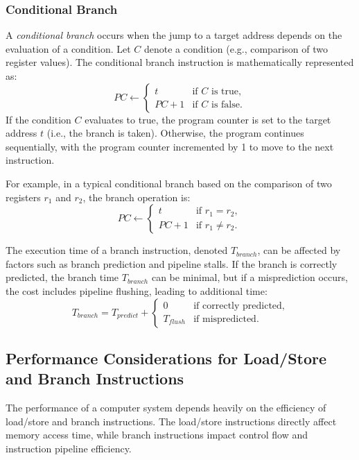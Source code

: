 \subsubsection{Conditional Branch}

A \emph{conditional branch} occurs when the jump to a target address depends on the evaluation of a condition. Let $C$ denote a condition (e.g., comparison of two register values). The conditional branch instruction is mathematically represented as:
\[
PC \gets 
\begin{cases} 
	t & \text{if } C \text{ is true}, \\
	PC + 1 & \text{if } C \text{ is false}.
\end{cases}
\]
If the condition $C$ evaluates to true, the program counter is set to the target address $t$ (i.e., the branch is taken). Otherwise, the program continues sequentially, with the program counter incremented by 1 to move to the next instruction.

For example, in a typical conditional branch based on the comparison of two registers $r_1$ and $r_2$, the branch operation is:
\[
PC \gets 
\begin{cases} 
	t & \text{if } r_1 = r_2, \\
	PC + 1 & \text{if } r_1 \neq r_2.
\end{cases}
\]

The execution time of a branch instruction, denoted $T_{branch}$, can be affected by factors such as branch prediction and pipeline stalls. If the branch is correctly predicted, the branch time $T_{branch}$ can be minimal, but if a misprediction occurs, the cost includes pipeline flushing, leading to additional time:
\[
T_{branch} = T_{predict} + 
\begin{cases}
	0 & \text{if correctly predicted}, \\
	T_{flush} & \text{if mispredicted}.
\end{cases}
\]

\subsection{Performance Considerations for Load/Store and Branch Instructions}

The performance of a computer system depends heavily on the efficiency of load/store and branch instructions. The load/store instructions directly affect memory access time, while branch instructions impact control flow and instruction pipeline efficiency.

